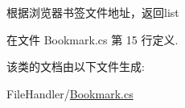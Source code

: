 根据浏览器书签文件地址，返回list 



在文件 Bookmark.\-cs 第 15 行定义.



该类的文档由以下文件生成\-:\begin{DoxyCompactItemize}
\item 
File\-Handler/\hyperlink{_bookmark_8cs}{Bookmark.\-cs}\end{DoxyCompactItemize}
